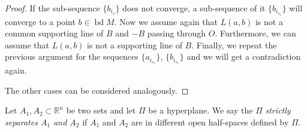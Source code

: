 \documentclass[12pt]{amsart}
\newcommand{\bd}{\operatorname*{bd}}
\newcommand{\Rn}{\mathbb{R}^{n}}
\begin{document}
\begin{proof}
              If the sub-sequence $\{b_{i_s}\}$ does not converge, a sub-sequence 
              of it $\{b_{i_{s_{r}}}\}$ will converge to a point $b\in \bd M$. Now we 
              assume again that $L(a,b)$ is not a common supporting line of $B$ 
              and $-B$ passing through $O$. Furthermore, we can assume that 
              $L(a,b)$ is not a supporting line of $B$. Finally, we repeat the 
              previous argument for the sequences 
              $\{a_{i_{s_{r}}}\}$, $\{b_{i_{s_{r}}}\}$ and we will get a contradiction 
              again.
 
              The other cases can be considered analogously.
 \end{proof}
                 Let $A_1, A_2\subset \Rn$ be two sets and let $\Pi$ be a hyperplane. We say the $\Pi$ 
                 \textit{strictly separates $A_1$ and $A_2$} if $A_1$ and $A_2$ are in different open half-spaces 
                  defined by $\Pi$. 
    
\end{document}
